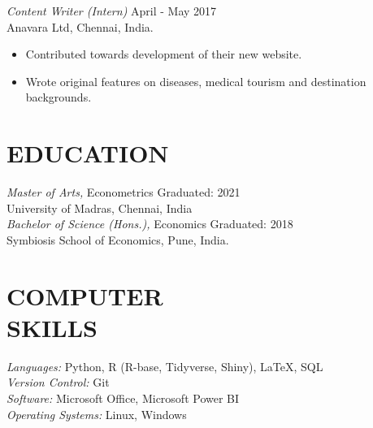 \documentclass[margin]{res}
\begin{document}
\begin{resume}
{\sl Content Writer (Intern)} 					\hfill April - May 2017\\
Anavara Ltd, Chennai, India.
\begin{itemize}  \itemsep -2pt %
	\item Contributed towards development of their new website.
	\item Wrote original features on diseases, medical tourism and destination backgrounds.
\end{itemize}

\section{EDUCATION}

				{\sl Master of Arts,} Econometrics 					\hfill Graduated: 2021\\
				University of Madras, Chennai, India \vspace{2mm}\\
				{\sl Bachelor of Science (Hons.),}  Economics  \hfill Graduated: 2018\\             				Symbiosis School of Economics, Pune, India.
                

\section{COMPUTER \\ SKILLS}
				{\sl Languages:} Python, R (R-base, Tidyverse, Shiny), \LaTeX, SQL\\
				{\sl Version Control:} Git\\
				{\sl Software:} Microsoft Office, Microsoft Power BI\\
                {\sl Operating Systems:} Linux, Windows


\end{resume}
\end{document}
